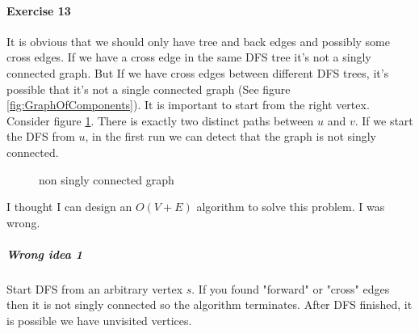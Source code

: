 \documentclass{book}
\begin{document}
	\paragraph{Exercise 13}
	It is obvious that we should only have tree and back edges and possibly some cross edges. If we have a cross edge in the same DFS tree it's not a singly connected graph. But If we have cross edges between different DFS trees, it's possible that it's not a single connected graph (See figure \ref{fig:GraphOfComponents}). It is important to start from the right vertex. Consider figure \ref{fig:NonSinglyConnectedGraph}. There is exactly two distinct paths between $u$ and $v$. If we start the DFS from $u$, in the first run we can detect that the graph is not singly connected.
	\begin{figure}[h!]
		\centering
		\caption{non singly connected graph}
		\label{fig:NonSinglyConnectedGraph}		
	\end{figure}
	I thought I can design an $O(V + E)$ algorithm to solve this problem. I was wrong.
	\subparagraph{Wrong idea 1}
	Start DFS from an arbitrary vertex $s$. If you found "forward" or "cross" edges then it is not singly connected so the algorithm terminates. After DFS finished, it is possible we have unvisited vertices.
	
\end{document}
